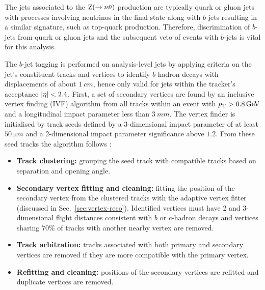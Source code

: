 The jets associated to the ${\mathrm{Z}(\rightarrow\nu\bar{\nu})}$ production are typically quark or gluon jets with processes involving neutrinos in the final state along with $b$-jets resulting in a similar signature, such as top-quark production. Therefore, discrimination of $b$-jets from quark or gluon jets and the subsequent veto of events with $b$-jets is vital for this analysis.

The $b$-jet tagging is performed on analysis-level jets by applying criteria on the jet's constituent tracks and vertices to identify $b$-hadron decays with displacements of about $\SI{1}{cm}$, hence only valid for jets within the tracker's acceptance ${|\eta|<2.4}$. First, a set of secondary vertices are found by an inclusive vertex finding (IVF) algorithm from all tracks within an event with ${p_{\text{T}}>\SI{0.8}{GeV}}$ and a longitudinal impact parameter less than ${\SI{3}{mm}}$. The vertex finder is initialised by track seeds defined by a 3-dimensional impact parameter of at least ${\SI{50}{\micro m}}$ and a 2-dimensional impact parameter significance above $1.2$. From these seed tracks the algorithm follows \cite{Sirunyan:2017ezt}:
\begin{itemize}
    \item \textbf{Track clustering:} grouping the seed track with compatible tracks based on separation and opening angle.
    \item \textbf{Secondary vertex fitting and cleaning:} fitting the position of the secondary vertex from the clustered tracks with the adaptive vertex fitter (discussed in Sec.~\ref{sec:vertex-reco}). Identified vertices must have 2 and 3-dimensional flight distances consistent with $b$ or $c$-hadron decays and vertices sharing $70\%$ of tracks with another nearby vertex are removed.
    \item \textbf{Track arbitration:} tracks associated with both primary and secondary vertices are removed if they are more compatible with the primary vertex.
    \item \textbf{Refitting and cleaning:} positions of the secondary vertices are refitted and duplicate vertices are removed.
\end{itemize}
